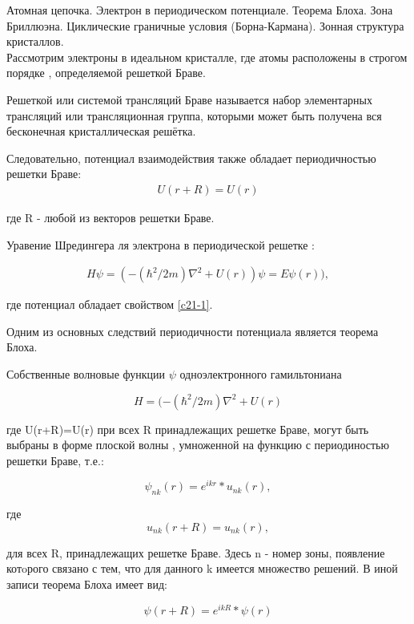 \documentclass[__main__.tex]{subfiles}
\begin{document}
Атомная цепочка. Электрон в периодическом потенциале. Теорема Блоха. Зона Бриллюэна. Циклические граничные условия (Борна-Кармана). Зонная структура кристаллов.\\ 

Рассмотрим электроны  в идеальном кристалле, где атомы расположены в строгом порядке , определяемой решеткой Браве.\\
\begin{definition}
	\label{orp1}
	Решеткой или системой трансляций Браве называется набор элементарных трансляций или трансляционная группа, которыми может быть получена вся бесконечная кристаллическая решётка.
\end{definition}

 Следовательно, потенциал взаимодействия также обладает периодичностью решетки Браве:
 \begin{gather}
 	\label{c21-1}
  U(r+R)=U(r) 
 \end{gather}
 
 где R - любой из векторов решетки Браве.
 
 Уравение Шредингера ля электрона в периодической решетке :
 
 \begin{gather}
 	\label{c21-2}
 	  H \psi=(-(\hbar^2/2m) \nabla^2+U(r))\psi=E\psi(r)),  
 \end{gather}

где потенциал обладает свойством \ref{c21-1}.

 Одним из основных следствий периодичности потенциала является теорема Блоха.\\
 \begin{theorem}
 	Собственные волновые функции $\psi$ одноэлектронного гамильтониана
 	
 	 $$H=(-(\hbar^2/2m) \nabla^2+U(r)$$
 	 
 	 где U(r+R)=U(r) при всех R принадлежащих решетке Браве, могут быть выбраны в форме плоской волны , умноженной на функцию с периодиностью  решетки Браве, т.е.:
 	 
 	 $$\psi_{nk} (r)=e^{ikr}*u_{nk}(r),$$
 	 
 	 где $$u_{nk}(r+R)=u_{nk}(r),$$
 	 
 	 для всех R, принадлежащих решетке Браве. Здесь n - номер зоны, появление котoрого связано с тем, что для данного k имеется множество решений.
 	 В иной записи теорема Блоха имеет вид:
 	 
 	$$\psi(r+R)=e^{ikR}*\psi(r)$$
 \end{theorem}
\end{document}
